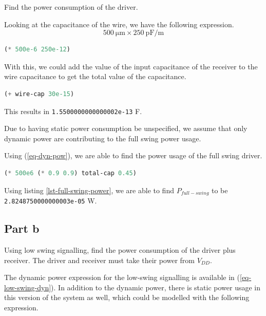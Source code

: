\documentclass[hidelinks, 12pt]{article}
\begin{document}
Find the power consumption of the driver.

Looking at the capacitance of the wire, we have the following expression.
\[\qty{500}{\micro\meter} \times \qty{250}{\pico\farad\per\meter}\]

\begin{lstlisting}[frame=single,basicstyle=\ttfamily,keywordstyle=\color{black}\bfseries\underbar,language=Lisp,label=lst-wire-cap,caption={Quick code used to find the wire capacitance.},captionpos=b,numbers=none]
(* 500e-6 250e-12)
\end{lstlisting}

With this, we could add the value of the input capacitance of the receiver to the wire capacitance to get the total value of the capacitance.

\begin{lstlisting}[frame=single,basicstyle=\ttfamily,keywordstyle=\color{black}\bfseries\underbar,language=Lisp,label=lst-total-cap,caption={Quick code used to find the wire capacitance.},captionpos=b,numbers=none]
(+ wire-cap 30e-15)
\end{lstlisting}

This results in \texttt{1.5500000000000002e-13} \unit{\farad}.

Due to having static power consumption be unspecified, we assume that only dynamic power are contributing to the full swing power usage.

Using (\ref{eq-dyn-pow}), we are able to find the power usage of the full swing driver.

\begin{lstlisting}[frame=single,basicstyle=\ttfamily,keywordstyle=\color{black}\bfseries\underbar,language=Lisp,label=lst-full-swing-power,caption={The expression for the power usage of the driver when using full swing signalling.},captionpos=b,numbers=none]
(* 500e6 (* 0.9 0.9) total-cap 0.45)
\end{lstlisting}

Using listing \ref{lst-full-swing-power}, we are able to find \(P_{full-swing}\) to be \texttt{2.8248750000000003e-05} \unit{\watt}.
\subsection*{Part b}
\label{sec:orga907d91}
Using low swing signalling, find the power consumption of the driver plus receiver.
The driver and receiver must take their power from \(V_{DD}\).

The dynamic power expression for the low-swing signalling is available in (\ref{eq-low-swing-dyn}).
In addition to the dynamic power, there is static power usage in this version of the system as well, which could be modelled with the following expression.
\end{document}
